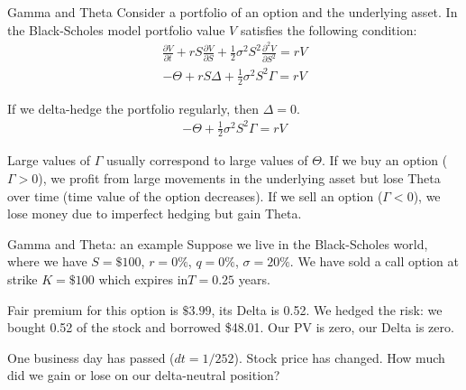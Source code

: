 \documentclass{beamer}
\begin{document}
\begin{frame}{Gamma and Theta}
\justify
Consider a portfolio of an option and the underlying asset. In the Black-Scholes model portfolio value $V$ satisfies the following condition:
\begin{align*}
\frac{\partial V}{\partial t} + rS\frac{\partial V}{\partial S} + \frac{1}{2}\sigma^2S^2\frac{\partial^2 V}{\partial S^2} = rV
\end{align*}
\begin{align*}
-\Theta + rS\Delta + \frac{1}{2}\sigma^2S^2\Gamma = rV
\end{align*}

If we delta-hedge the portfolio regularly, then $\Delta=0$.
\begin{align*}
-\Theta + \frac{1}{2}\sigma^2S^2\Gamma = rV
\end{align*}

\justify
Large values of $\Gamma$ usually correspond to large values of $\Theta$. If we buy an option ($\Gamma > 0$), we profit from large movements in the underlying asset but lose Theta over time (time value of the option decreases). If we sell an option ($\Gamma < 0$), we lose money due to imperfect hedging but gain Theta.
\end{frame}



\begin{frame}{Gamma and Theta: an example}
\justify
Suppose we live in the Black-Scholes world, where we have $S=\$100$, $r=0\%$, $q=0\%$, $\sigma=20\%$. We have \alert{sold} a call option at strike $K=\$100$ which expires in$T=0.25$  years.

\justify
Fair premium for this option is $\$3.99$, its Delta is 0.52. We hedged the risk: we bought 0.52 of the stock and borrowed \$48.01. Our PV is zero, our Delta is zero.

\justify
One business day has passed ($dt = 1/252$). Stock price has changed. How much did we gain or lose on our delta-neutral position?
\end{frame}
\end{document}
